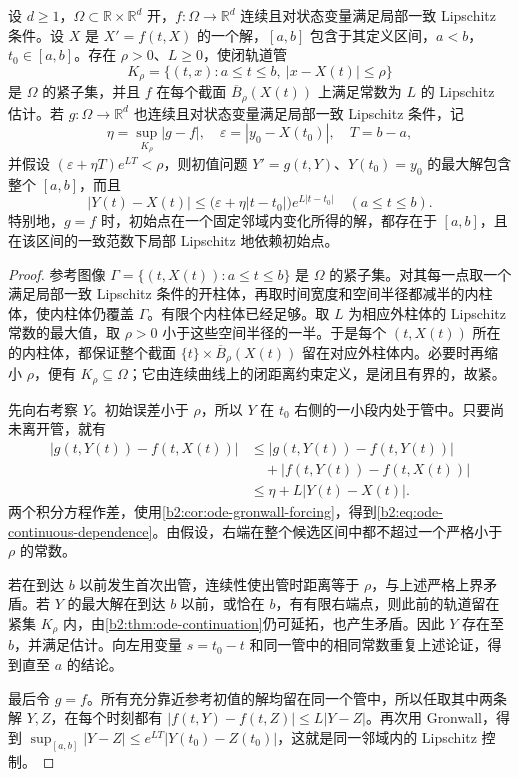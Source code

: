 \begin{theorem}[紧时间区间上的连续依赖]\label{b2:thm:ode-continuous-dependence}
设 \(d\geq1\)，\(\Omega\subset\mathbb R\times\mathbb R^d\) 开，\(f\colon\Omega\to\mathbb R^d\) 连续且对状态变量满足局部一致 Lipschitz 条件。设 \(X\) 是 \(X'=f(t,X)\) 的一个解，\([a,b]\) 包含于其定义区间，\(a<b\)，\(t_0\in[a,b]\)。存在 \(\rho>0\)、\(L\geq0\)，使闭轨道管
\[
 K_\rho=\{(t,x):a\leq t\leq b,\ |x-X(t)|\leq\rho\}
\]
是 \(\Omega\) 的紧子集，并且 \(f\) 在每个截面 \(\overline B_\rho(X(t))\) 上满足常数为 \(L\) 的 Lipschitz 估计。若 \(g\colon\Omega\to\mathbb R^d\) 也连续且对状态变量满足局部一致 Lipschitz 条件，记
\[
 \eta=\sup_{K_\rho}|g-f|,\quad \varepsilon=|y_0-X(t_0)|,
 \quad T=b-a,
\]
并假设 \((\varepsilon+\eta T)e^{LT}<\rho\)，则初值问题 \(Y'=g(t,Y)\)、\(Y(t_0)=y_0\) 的最大解包含整个 \([a,b]\)，而且
\begin{equation}\label{b2:eq:ode-continuous-dependence}
 |Y(t)-X(t)|
 \leq\bigl(\varepsilon+\eta|t-t_0|\bigr)e^{L|t-t_0|}
 \quad(a\leq t\leq b).
\end{equation}
特别地，\(g=f\) 时，初始点在一个固定邻域内变化所得的解，都存在于 \([a,b]\)，且在该区间的一致范数下局部 Lipschitz 地依赖初始点。
\end{theorem}
\begin{proof}
参考图像 \(\Gamma=\{(t,X(t)):a\leq t\leq b\}\) 是 \(\Omega\) 的紧子集。对其每一点取一个满足局部一致 Lipschitz 条件的开柱体，再取时间宽度和空间半径都减半的内柱体，使内柱体仍覆盖 \(\Gamma\)。有限个内柱体已经足够。取 \(L\) 为相应外柱体的 Lipschitz 常数的最大值，取 \(\rho>0\) 小于这些空间半径的一半。于是每个 \((t,X(t))\) 所在的内柱体，都保证整个截面 \(\{t\}\times\overline B_\rho(X(t))\) 留在对应外柱体内。必要时再缩小 \(\rho\)，便有 \(K_\rho\subseteq\Omega\)；它由连续曲线上的闭距离约束定义，是闭且有界的，故紧。

先向右考察 \(Y\)。初始误差小于 \(\rho\)，所以 \(Y\) 在 \(t_0\) 右侧的一小段内处于管中。只要尚未离开管，就有
\[
 \begin{aligned}
 |g(t,Y(t))-f(t,X(t))|
 &\leq |g(t,Y(t))-f(t,Y(t))|\\
 &\quad+|f(t,Y(t))-f(t,X(t))|\\
 &\leq\eta+L|Y(t)-X(t)|.
 \end{aligned}
\]
两个积分方程作差，使用\cref{b2:cor:ode-gronwall-forcing}，得到\eqref{b2:eq:ode-continuous-dependence}。由假设，右端在整个候选区间中都不超过一个严格小于 \(\rho\) 的常数。

若在到达 \(b\) 以前发生首次出管，连续性使出管时距离等于 \(\rho\)，与上述严格上界矛盾。若 \(Y\) 的最大解在到达 \(b\) 以前，或恰在 \(b\)，有有限右端点，则此前的轨道留在紧集 \(K_\rho\) 内，由\cref{b2:thm:ode-continuation}仍可延拓，也产生矛盾。因此 \(Y\) 存在至 \(b\)，并满足估计。向左用变量 \(s=t_0-t\) 和同一管中的相同常数重复上述论证，得到直至 \(a\) 的结论。

最后令 \(g=f\)。所有充分靠近参考初值的解均留在同一个管中，所以任取其中两条解 \(Y,Z\)，在每个时刻都有 \(|f(t,Y)-f(t,Z)|\leq L|Y-Z|\)。再次用 Gronwall，得到 \(\sup_{[a,b]}|Y-Z|\leq e^{LT}|Y(t_0)-Z(t_0)|\)，这就是同一邻域内的 Lipschitz 控制。
\end{proof}

